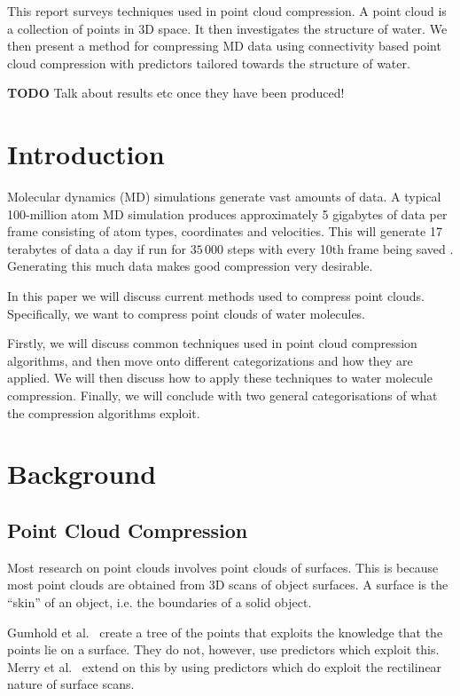 \documentclass{report}
\begin{document}
This report surveys techniques used in point cloud compression. A point cloud
is a collection of points in 3D space. It then investigates the structure of
water. We then present a method for compressing MD data using connectivity
based point cloud compression with predictors tailored towards the structure
of water.

\textbf{TODO} Talk about results etc once they have been produced!

\tableofcontents

\chapter{Introduction}

Molecular dynamics (MD) simulations generate vast amounts of data. A typical
100-million atom MD simulation produces approximately 5 gigabytes of data per
frame consisting of atom types, coordinates and velocities. This will generate
17 terabytes of data a day if run for $35\,000$ steps with every 10th frame
being saved \cite{omeltchenko2000sls}. Generating this much data makes good
compression very desirable.

In this paper we will discuss current methods used to compress point
clouds. Specifically, we want to compress point clouds of water molecules.

Firstly, we will discuss common techniques used in point cloud compression
algorithms, and then move onto different categorizations and how they are
applied. We will then discuss how to apply these techniques to water molecule
compression. Finally, we will conclude with two general categorisations of
what the compression algorithms exploit.

\chapter{Background}

\section{Point Cloud Compression}

Most research on point clouds involves point clouds of surfaces. This is
because most point clouds are obtained from 3D scans of object surfaces. A
surface is the ``skin'' of an object, i.e. the boundaries of a solid object.

Gumhold et al.~\cite{gumholdcomp} create a tree of the points that exploits
the knowledge that the points lie on a surface. They do not, however, use
predictors which exploit this. Merry et al.~\cite{merrycomp} extend on this by
using predictors which do exploit the rectilinear nature of surface scans.
\end{document}
